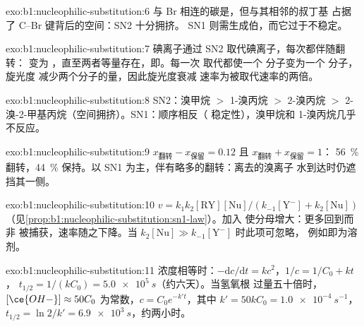 \begin{solution}{exo:b1:nucleophilic-substitution:6}
与 Br 相连的碳是，但与其相邻的叔丁基
占据了 C--Br 键背后的空间：SN2 十分拥挤。
SN1 则需生成伯，而它过于不稳定。
\end{solution}

\begin{solution}{exo:b1:nucleophilic-substitution:7}
碘离子通过 SN2 取代碘离子，每次都伴随翻转： 变为
，直至两者等量存在，即。每一次
取代都使一个  分子变为一个  分子，旋光度
减少两个分子的量，因此旋光度衰减
速率为被取代速率的两倍。
\end{solution}

\begin{solution}{exo:b1:nucleophilic-substitution:8}
SN2：溴甲烷 $>$ 1-溴丙烷 $>$ 2-溴丙烷 $>$
2-溴-2-甲基丙烷（空间拥挤）。SN1：顺序相反（
稳定性），溴甲烷和 1-溴丙烷几乎不反应。
\end{solution}

\begin{solution}{exo:b1:nucleophilic-substitution:9}
$x_{\text{翻转}} - x_{\text{保留}} = 0.12$ 且 $x_{\text{翻转}} + x_{\text{保留}} = 1$：
\qty{56}{\percent} 翻转，\qty{44}{\percent} 保持。以 SN1
为主，伴有略多的翻转：离去的溴离子
水到达时仍遮挡其一侧。
\end{solution}

\begin{solution}{exo:b1:nucleophilic-substitution:10}
$v = k_1k_2[\mathrm{RY}][\mathrm{Nu}]/(k_{-1}[\mathrm{Y^-}] + k_2[\mathrm{Nu}])$
（见\cref{prop:b1:nucleophilic-substitution:sn1-law}）。加入 
使分母增大：更多回到而非
被捕获，速率随之下降。当
$k_2[\mathrm{Nu}] \gg k_{-1}[\mathrm{Y^-}]$ 时此项可忽略，
例如即为溶剂。
\end{solution}

\begin{solution}{exo:b1:nucleophilic-substitution:11}
浓度相等时：$-\mathrm{d}c/\mathrm{d}t = kc^2$，$1/c = 1/C_0 + kt$，
$t_{1/2} = 1/(kC_0) = \qty{5.0e5}{s}$（约六天）。当氢氧根
过量五十倍时，$[\ce{OH-}] \approx 50C_0$ 为常数，$c = C_0
e^{-k't}$，其中 $k' = 50kC_0 = \qty{1.0e-4}{s^{-1}}$，$t_{1/2} = \ln 2/k' =
\qty{6.9e3}{s}$，约两小时。
\end{solution}

